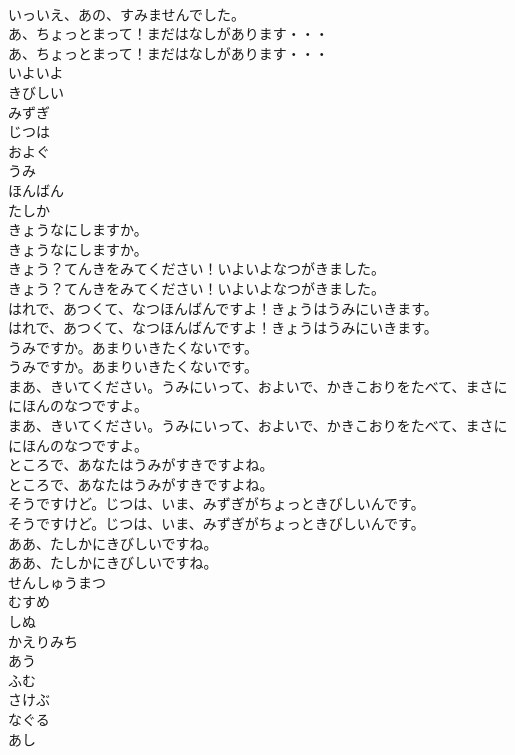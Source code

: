 \documentclass[8pt]{extreport}
\begin{document}
\begin{CJK}{UTF8}{min}
\\	いっいえ、あの、すみませんでした。 
\\	あ、ちょっとまって！まだはなしがあります・・・	
\\	あ、ちょっとまって！まだはなしがあります・・・ 
\\	いよいよ
\\	きびしい
\\	みずぎ
\\	じつは
\\	およぐ
\\	うみ
\\	ほんばん
\\	たしか
\\	きょうなにしますか。	
\\	きょうなにしますか。 
\\	きょう？てんきをみてください！いよいよなつがきました。	
\\	きょう？てんきをみてください！いよいよなつがきました。 
\\	はれで、あつくて、なつほんばんですよ！きょうはうみにいきます。	
\\	はれで、あつくて、なつほんばんですよ！きょうはうみにいきます。 
\\	うみですか。あまりいきたくないです。	
\\	うみですか。あまりいきたくないです。 
\\	まあ、きいてください。うみにいって、およいで、かきこおりをたべて、まさににほんのなつですよ。	
\\	まあ、きいてください。うみにいって、およいで、かきこおりをたべて、まさににほんのなつですよ。 
\\	ところで、あなたはうみがすきですよね。	
\\	ところで、あなたはうみがすきですよね。 
\\	そうですけど。じつは、いま、みずぎがちょっときびしいんです。	
\\	そうですけど。じつは、いま、みずぎがちょっときびしいんです。 
\\	ああ、たしかにきびしいですね。	
\\	ああ、たしかにきびしいですね。 
\\	せんしゅうまつ
\\	むすめ
\\	しぬ
\\	かえりみち
\\	あう
\\	ふむ
\\	さけぶ
\\	なぐる
\\	あし

\end{CJK}
\end{document}
